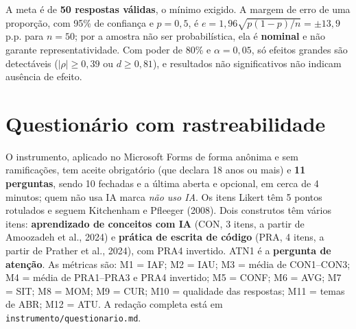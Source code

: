 \documentclass[12pt,a4paper]{article}
\begin{document}
A meta é de \textbf{50 respostas válidas}, o mínimo exigido. A margem de erro de uma proporção, com 95\% de confiança e $p=0{,}5$, é $e = 1{,}96\sqrt{p(1-p)/n} = \pm13{,}9$ p.p. para $n=50$; por a amostra não ser probabilística, ela é \textbf{nominal} e não garante representatividade. Com poder de 80\% e $\alpha=0{,}05$, só efeitos grandes são detectáveis ($|\rho|\geq0{,}39$ ou $d\geq0{,}81$), e resultados não significativos não indicam ausência de efeito.

\section{Questionário com rastreabilidade}

O instrumento, aplicado no Microsoft Forms de forma anônima e sem ramificações, tem aceite obrigatório (que declara 18 anos ou mais) e \textbf{11 perguntas}, sendo 10 fechadas e a última aberta e opcional, em cerca de 4 minutos; quem não usa IA marca \emph{não uso IA}. Os itens Likert têm 5 pontos rotulados e seguem Kitchenham e Pfleeger (2008). Dois construtos têm vários itens: \textbf{aprendizado de conceitos com IA} (CON, 3 itens, a partir de Amoozadeh et al., 2024) e \textbf{prática de escrita de código} (PRA, 4 itens, a partir de Prather et al., 2024), com PRA4 invertido. ATN1 é a \textbf{pergunta de atenção}. As métricas são: M1 = IAF; M2 = IAU; M3 = média de CON1–CON3; M4 = média de PRA1–PRA3 e PRA4 invertido; M5 = CONF; M6 = AVG; M7 = SIT; M8 = MOM; M9 = CUR; M10 = qualidade das respostas; M11 = temas de ABR; M12 = ATU. A redação completa está em \texttt{instrumento/questionario.md}.
\end{document}
